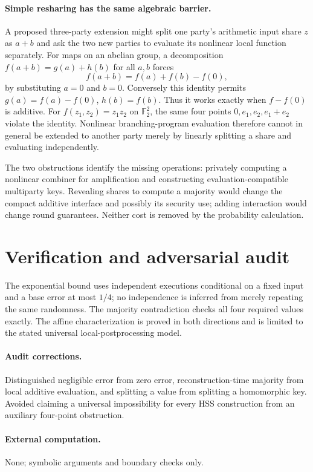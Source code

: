 \documentclass[11pt]{article}
\begin{document}
\paragraph{Simple resharing has the same algebraic barrier.}
A proposed three-party extension might split one party's arithmetic input share $z$ as $a+b$ and ask the two new parties to evaluate its nonlinear local function separately. For maps on an abelian group, a decomposition $f(a+b)=g(a)+h(b)$ for all $a,b$ forces
\[
 f(a+b)=f(a)+f(b)-f(0),
\]
by substituting $a=0$ and $b=0$. Conversely this identity permits $g(a)=f(a)-f(0)$, $h(b)=f(b)$. Thus it works exactly when $f-f(0)$ is additive. For $f(z_1,z_2)=z_1z_2$ on $\mathbb F_2^2$, the same four points $0,e_1,e_2,e_1+e_2$ violate the identity. Nonlinear branching-program evaluation therefore cannot in general be extended to another party merely by linearly splitting a share and evaluating independently.

The two obstructions identify the missing operations: privately computing a nonlinear combiner for amplification and constructing evaluation-compatible multiparty keys. Revealing shares to compute a majority would change the compact additive interface and possibly its security use; adding interaction would change round guarantees. Neither cost is removed by the probability calculation.
\section{Verification and adversarial audit}
The exponential bound uses independent executions conditional on a fixed input and a base error at most $1/4$; no independence is inferred from merely repeating the same randomness. The majority contradiction checks all four required values exactly. The affine characterization is proved in both directions and is limited to the stated universal local-postprocessing model.
\paragraph{Audit corrections.} Distinguished negligible error from zero error, reconstruction-time majority from local additive evaluation, and splitting a value from splitting a homomorphic key. Avoided claiming a universal impossibility for every HSS construction from an auxiliary four-point obstruction.
\paragraph{External computation.} None; symbolic arguments and boundary checks only.
\end{document}
